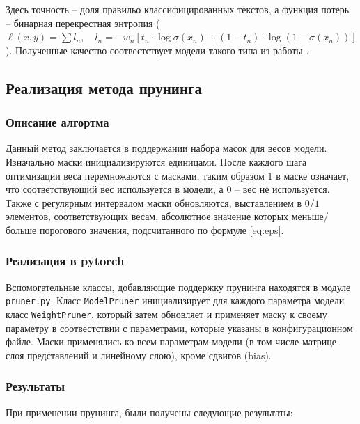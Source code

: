 \documentclass[12pt]{article}
\begin{document}
Здесь точность -- доля правильо классифицированных текстов, а функция потерь -- бинарная перекрестная энтропия 
($\ell(x, y) = \sum l_n, \quad l_n = - w_n \left[ t_n \cdot \log \sigma(x_n) + (1 - t_n) \cdot \log (1 - \sigma(x_n)) \right]$). 
Полученные качество соотвестствует модели такого типа из работы \cite{stanfordrep}.

\subsection*{Реализация метода прунинга}
%
\subsubsection*{Описание алгортма}
Данный метод заключается в поддержании набора масок для весов модели. Изначально 
маски инициализируются единицами. После каждого шага оптимизации веса перемножаются 
с масками, таким образом $1$ в маске означает, что соответствующий вес используется в модели, а $0$ -- вес не используется. Также с регулярным интервалом маски обновляются, выставлением в $0$/$1$ элементов,
соответствующих весам, абсолютное значение которых меньше/больше порогового значения, подсчитанного 
по формуле \ref{eq:eps}.
\subsubsection*{Реализация в pytorch}
Вспомогательные классы, добавляющие поддержку прунинга находятся в модуле
\texttt{pruner.py}. Класс \texttt{ModelPruner} инициализирует для каждого 
параметра модели класс \texttt{WeightPruner}, который затем обновляет и применяет
маску к своему параметру в соотвестствии с параметрами, которые указаны в 
конфигурационном файле. Маски применялись ко всем параметрам модели (в том числе матрице слоя 
представлений и линейному слою), кроме сдвигов (bias).

\subsubsection*{Результаты}
При применении прунинга, были получены следующие результаты:
\end{document}

